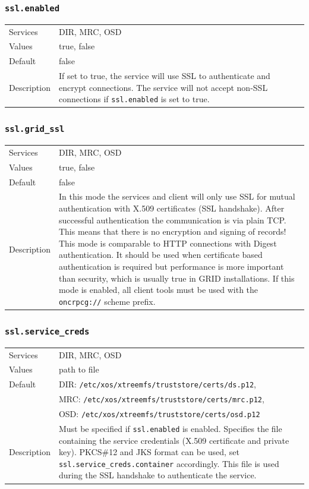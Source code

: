 \documentclass[a4paper,10pt]{book}
\begin{document}
\subsubsection{\texttt{ssl.enabled}}
\begin{tabular}{lp{10cm}}
 Services & DIR, MRC, OSD\\
 Values   & true, false \\
 Default  & false \\
 Description & If set to true, the service will use SSL to authenticate and encrypt connections. The service will not accept non-SSL connections if \texttt{ssl.enabled} is set to true.
\end{tabular}

\subsubsection{\texttt{ssl.grid\_ssl}}
\begin{tabular}{lp{10cm}}
 Services & DIR, MRC, OSD\\
 Values   & true, false \\
 Default  & false \\
 Description & In this mode the services and client will only use SSL for mutual authentication with X.509 certificates (SSL handshake). After successful authentication the communication is via plain TCP. This means that there is no encryption and signing of records! This mode is comparable to HTTP connections with Digest authentication. It should be used when certificate based authentication is required but performance is more important than security, which is usually true in GRID installations. If this mode is enabled, all client tools must be used with the \texttt{oncrpcg://} scheme prefix.
\end{tabular}

\subsubsection{\texttt{ssl.service\_creds}}
\begin{tabular}{lp{10cm}}
 Services & DIR, MRC, OSD\\
 Values   & path to file\\
 Default  & DIR: \texttt{/etc/xos/xtreemfs/truststore/certs/ds.p12}, \\
 & MRC: \texttt{/etc/xos/xtreemfs/truststore/certs/mrc.p12}, \\
 & OSD: \texttt{/etc/xos/xtreemfs/truststore/certs/osd.p12}\\
 Description & Must be specified if \texttt{ssl.enabled} is enabled. Specifies the file containing the service credentials (X.509 certificate and private key). PKCS\#12 and JKS format can be used, set \texttt{ssl.service\_creds.container} accordingly. This file is used during the SSL handshake to authenticate the service.
\end{tabular}
\end{document}
